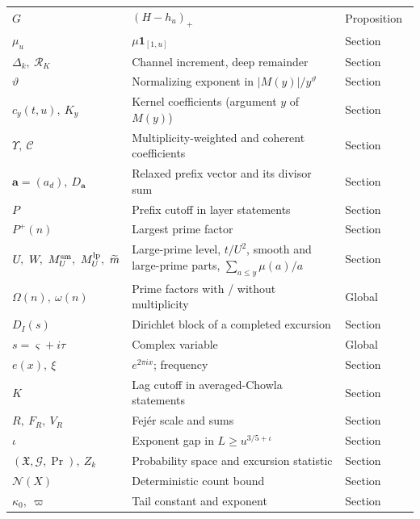 \documentclass[11pt,reqno]{amsart}
\makeatletter
\let\CG@origref\ref
\newcommand{\CG@gettip}[1]{\@ifundefined{CGTip@#1}{Reference: #1}{\csname CGTip@#1\endcsname}}
\DeclareRobustCommand{\CGref}[1]{\pdftooltip{\CG@origref{#1}}{\CG@gettip{#1}}}
\numberwithin{equation}{section}
\theoremstyle{plain}
\theoremstyle{definition}
\theoremstyle{remark}
\newcommand{\Pp}{P^{+}}
\newcommand{\Cc}{\mathcal{C}}
\newcommand{\mt}{\widetilde{m}}
\makeatother
\begin{document}
\begin{longtable}{@{}p{}p{}p{}@{}}
$G$ & $(H-h_u)_+$ & Proposition~\CGref{prop:wide-peaks}\\
$\mu_u$ & $\mu\mathbf 1_{[1,u]}$ & Section~\CGref{sec:prefix}\\
$\Delta_k,\ \mathcal R_K$ & Channel increment, deep remainder & Section~\CGref{sec:prefix}\\
$\vartheta$ & Normalizing exponent in $|M(y)|/y^\vartheta$ & Section~\CGref{sec:prefix}\\
$c_y(t,u),\ K_y$ & Kernel coefficients (argument $y$ of $M(y)$) & Section~\CGref{sec:prefix}\\
$\Upsilon,\ \Cc$ & Multiplicity-weighted and coherent coefficients & Section~\CGref{sec:prefix}\\
$\mathbf a=(a_d),\ D_{\mathbf a}$ & Relaxed prefix vector and its divisor sum & Section~\CGref{sec:prefix}\\
$P$ & Prefix cutoff in layer statements & Section~\CGref{sec:prefix}\\
$\Pp(n)$ & Largest prime factor & Section~\CGref{sec:prefix}\\
$U,\ W,\ M^{\rm sm}_U,\ M^{\rm lp}_U,\ \mt$ & Large-prime level, $t/U^2$, smooth and large-prime parts, $\sum_{a\le y}\mu(a)/a$ & Section~\CGref{sec:prefix}\\
$\Omega(n),\ \omega(n)$ & Prime factors with / without multiplicity & Global\\
$D_I(s)$ & Dirichlet block of a completed excursion & Section~\CGref{sec:criteria}\\
$s=\varsigma+i\tau$ & Complex variable & Global\\
$e(x),\ \xi$ & $e^{2\pi ix}$; frequency & Section~\CGref{sec:chowla}\\
$K$ & Lag cutoff in averaged-Chowla statements & Section~\CGref{sec:chowla}\\
$R,\ F_R,\ V_R$ & Fejér scale and sums & Section~\CGref{sec:chowla}\\
$\iota$ & Exponent gap in $L\ge u^{3/5+\iota}$ & Section~\CGref{sec:chowla}\\
$(\mathfrak X,\mathcal G,\Pr),\ Z_k$ & Probability space and excursion statistic & Section~\CGref{sec:extreme}\\
$\mathcal N(X)$ & Deterministic count bound & Section~\CGref{sec:extreme}\\
$\kappa_0,\ \varpi$ & Tail constant and exponent & Section~\CGref{sec:extreme}\\
\bottomrule
\end{longtable}
\normalsize
\end{document}

